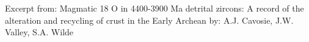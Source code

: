 \documentclass{article}
\begin{document}
	
	
Excerpt from: Magmatic 18 O in 4400-3900 Ma detrital zircons: 
A record of the alteration and recycling of crust in the Early Archean
by: A.J. Cavosie, J.W. Valley, S.A. Wilde

\section{}
\end{document}
